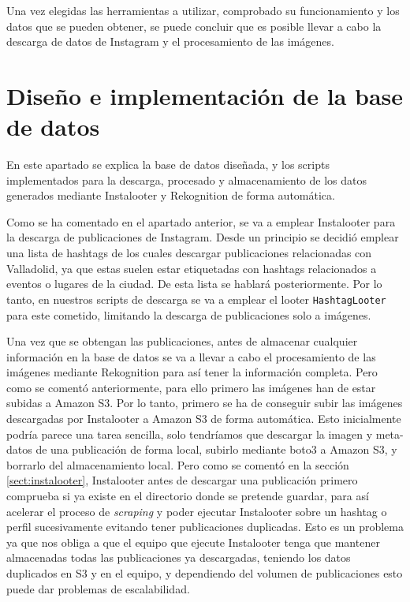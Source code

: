 Una vez elegidas las herramientas a utilizar, comprobado su funcionamiento y los datos que se pueden obtener, se puede concluir que es posible llevar a cabo la descarga de datos de Instagram y el procesamiento de las imágenes.

\section{Diseño e implementación de la base de datos}
\label{sect:dis_impl_bbdd}

En este apartado se explica la base de datos diseñada, y los scripts implementados para la descarga, procesado y almacenamiento de los datos generados mediante Instalooter y Rekognition de forma automática.

Como se ha comentado en el apartado anterior, se va a emplear Instalooter para la descarga de publicaciones de Instagram. Desde un principio se decidió emplear una lista de hashtags de los cuales descargar publicaciones relacionadas con Valladolid, ya que estas suelen estar etiquetadas con hashtags relacionados a eventos o lugares de la ciudad. De esta lista se hablará posteriormente. Por lo tanto, en nuestros scripts de descarga se va a emplear el looter \texttt{HashtagLooter} para este cometido, limitando la descarga de publicaciones solo a imágenes.

Una vez que se obtengan las publicaciones, antes de almacenar cualquier información en la base de datos se va a llevar a cabo el procesamiento de las imágenes mediante Rekognition para así tener la información completa. Pero como se comentó anteriormente, para ello primero las imágenes han de estar subidas a Amazon S3. Por lo tanto, primero se ha de conseguir subir las imágenes descargadas por Instalooter a Amazon S3 de forma automática. Esto inicialmente podría parece una tarea sencilla, solo tendríamos que descargar la imagen y meta-datos de una publicación de forma local, subirlo mediante boto3 a Amazon S3, y borrarlo del almacenamiento local. Pero como se comentó en la sección \ref{sect:instalooter}, Instalooter antes de descargar una publicación primero comprueba si ya existe en el directorio donde se pretende guardar, para así acelerar el proceso de \textit{scraping} y poder ejecutar Instalooter sobre un hashtag o perfil sucesivamente evitando tener publicaciones duplicadas. Esto es un problema ya que nos obliga a que el equipo que ejecute Instalooter tenga que mantener almacenadas todas las publicaciones ya descargadas, teniendo los datos duplicados en S3 y en el equipo, y dependiendo del volumen de publicaciones esto puede dar problemas de escalabilidad.

